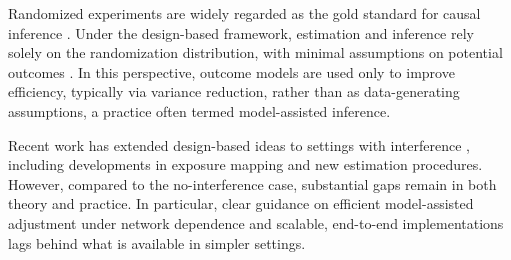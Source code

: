 \documentclass{article}
\theoremstyle{plain}
\theoremstyle{definition}
\theoremstyle{remark}
\begin{document}
Randomized experiments are widely regarded as the gold standard for causal inference \citep{hinkelmann2007design, imbens2015causal}. Under the design-based framework, estimation and inference rely solely on the randomization distribution, with minimal assumptions on potential outcomes \citep{neyman1923application, rubin2005causal, ding2024first}. In this perspective, outcome models are used only to improve efficiency, typically via variance reduction, rather than as data-generating assumptions, a practice often termed model-assisted inference.

Recent work has extended design-based ideas to settings with interference \citep{hudgens2008toward, aronow2017estimating, basse2018analyzing, chang2023design, leung2022causal, gao2023causal}, including developments in exposure mapping and new estimation procedures. However, compared to the no-interference case, substantial gaps remain in both theory and practice. In particular, clear guidance on efficient model-assisted adjustment under network dependence and scalable, end-to-end implementations lags behind what is available in simpler settings.





\end{document}
